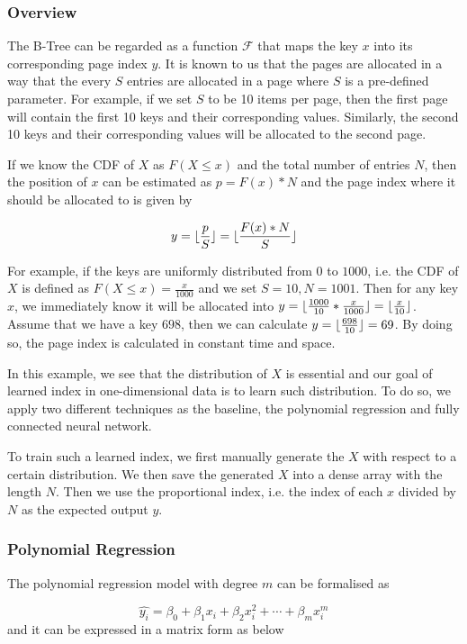 \subsubsection{Overview}

The B-Tree can be regarded as a function $\mathcal{F}$ that maps the key $x$ into its corresponding page index $y$. It is known to us that the pages are allocated in a way that the every $S$ entries are allocated in a page where $S$ is a pre-defined parameter. For example, if we set $S$ to be 10 items per page, then the first page will contain the first 10 keys and their corresponding values. Similarly, the second 10 keys and their corresponding values will be allocated to the second page.

If we know the CDF of $X$ as $F(X\leq x)$ and the total number of entries $N$, then the position of $x$ can be estimated as $p=F(x)*N$ and the page index where it should be allocated to is given by

$$y=\lfloor\frac{p}{S}\rfloor=\lfloor\frac{F(x)*N}{S}\rfloor$$  

For example, if the keys are uniformly distributed from $0$ to $1000$, i.e. the CDF of $X$ is defined as $F(X\leq x)=\frac{x}{1000}$ and we set $S=10, N=1001$. Then for any key $x$, we immediately know it will be allocated into $y=\lfloor\frac{1000}{10}*\frac{x}{1000}\rfloor=\lfloor\frac{x}{10}\rfloor$. Assume that we have a key $698$, then we can calculate $y=\lfloor\frac{698}{10}\rfloor=69$. By doing so, the page index is calculated in constant time and space.

In this example, we see that the distribution of $X$ is essential and our goal of learned index in one-dimensional data is to learn such distribution. To do so, we apply two different techniques as the baseline, the polynomial regression and fully connected neural network.

To train such a learned index, we first manually generate the $X$ with respect to a certain distribution. We then save the generated $X$ into a dense array with the length $N$. Then we use the proportional index, i.e. the index of each $x$ divided by $N$ as the expected output $y$.

\subsubsection{Polynomial Regression}
 
The polynomial regression model with degree $m$ can be formalised as 

$$ \hat{y_i}= \beta_0+\beta_1x_i+\beta_2x_i^2+\cdots+\beta_mx_i^m$$ and it can be expressed in a matrix form as below

